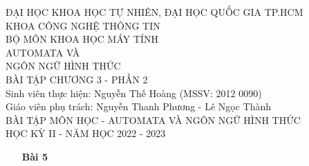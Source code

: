 \documentclass[12pt, a4paper]{article}
\begin{document}
	

	\begin{titlepage}
		\centering
		\large
		ĐẠI HỌC KHOA HỌC TỰ NHIÊN, ĐẠI HỌC QUỐC GIA TP.HCM\\[.1in]
		KHOA CÔNG NGHỆ THÔNG TIN\\BỘ MÔN KHOA HỌC MÁY TÍNH\\
		\vfill
		\huge AUTOMATA VÀ\\NGÔN NGỮ HÌNH THỨC\\[.1in]
		\LARGE BÀI TẬP CHƯƠNG 3 - PHẦN 2\\
		\vfill
		\RaggedRight
		\large
		Sinh viên thực hiện: Nguyễn Thế Hoàng (MSSV: 2012 0090)\\[.1in]
		Giáo viên phụ trách: Nguyễn Thanh Phương - Lê Ngọc Thành\\[.2in]
		\Centering
		BÀI TẬP MÔN HỌC - AUTOMATA VÀ NGÔN NGỮ HÌNH THỨC\\[.1in]
		HỌC KỲ II - NĂM HỌC 2022 - 2023
	\end{titlepage}
	
	\newpage	
	
	
	\begin{itemize}
		
		\item[ \textbf{Bài 5} ]
	
	\end{itemize}
	
\end{document}
